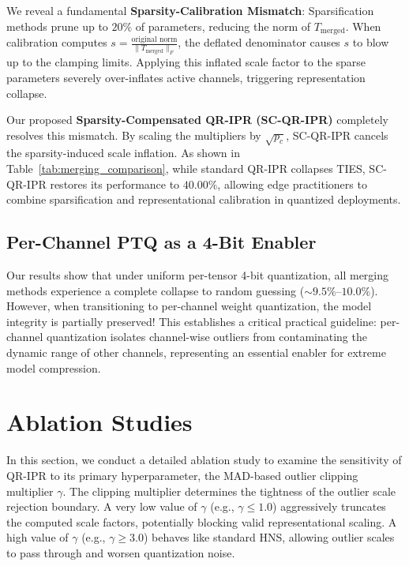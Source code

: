 \documentclass{article}
\theoremstyle{plain}
\theoremstyle{definition}
\theoremstyle{remark}
\begin{document}
We reveal a fundamental \textbf{Sparsity-Calibration Mismatch}: Sparsification methods prune up to $20\%$ of parameters, reducing the norm of $T_{\text{merged}}$. When calibration computes $s = \frac{\text{original norm}}{\|T_{\text{merged}}\|_F}$, the deflated denominator causes $s$ to blow up to the clamping limits. Applying this inflated scale factor to the sparse parameters severely over-inflates active channels, triggering representation collapse.

Our proposed \textbf{Sparsity-Compensated QR-IPR (SC-QR-IPR)} completely resolves this mismatch. By scaling the multipliers by $\sqrt{p_c}$, SC-QR-IPR cancels the sparsity-induced scale inflation. As shown in Table~\ref{tab:merging_comparison}, while standard QR-IPR collapses TIES, SC-QR-IPR restores its performance to $40.00\%$, allowing edge practitioners to combine sparsification and representational calibration in quantized deployments.

\vspace{-2.5mm}
\subsection{Per-Channel PTQ as a 4-Bit Enabler}
\vspace{-0.3mm}
Our results show that under uniform per-tensor 4-bit quantization, all merging methods experience a complete collapse to random guessing ($\sim 9.5\% \text{--} 10.0\%$). However, when transitioning to per-channel weight quantization, the model integrity is partially preserved!
This establishes a critical practical guideline: per-channel quantization isolates channel-wise outliers from contaminating the dynamic range of other channels, representing an essential enabler for extreme model compression.

\vspace{-2.0mm}
\section{Ablation Studies}
\label{sec:ablation}
\vspace{-2.5mm}

In this section, we conduct a detailed ablation study to examine the sensitivity of QR-IPR to its primary hyperparameter, the MAD-based outlier clipping multiplier $\gamma$. The clipping multiplier determines the tightness of the outlier scale rejection boundary. A very low value of $\gamma$ (e.g., $\gamma \le 1.0$) aggressively truncates the computed scale factors, potentially blocking valid representational scaling. A high value of $\gamma$ (e.g., $\gamma \ge 3.0$) behaves like standard HNS, allowing outlier scales to pass through and worsen quantization noise.
\end{document}
